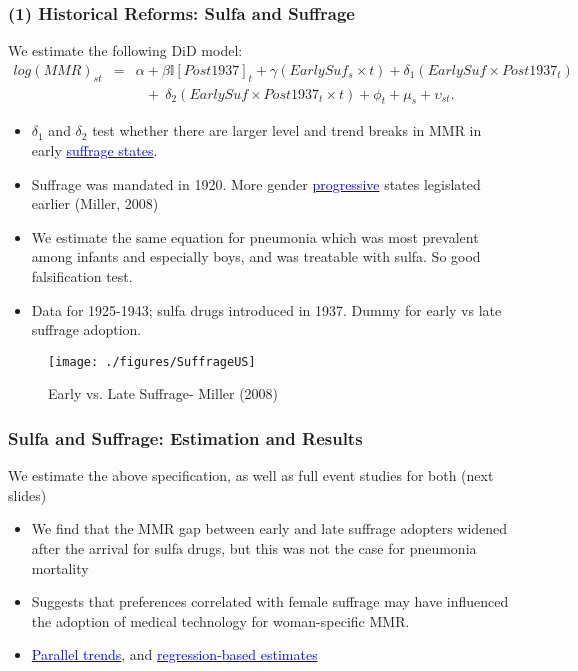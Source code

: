 \documentclass[10pt,letterpaper,subeqn]{beamer}
\begin{document}
\begin{frame}[label=USAHistory]
\frametitle{(1) Historical Reforms: Sulfa and Suffrage}

We estimate the following DiD model:
\scriptsize
\begin{eqnarray}
log(MMR)_{st} & = &\alpha + \beta \mathbb{I}[Post1937]_t + \gamma(EarlySuf_{s}\times t)
                + \delta_1 (EarlySuf\times Post1937_t) \nonumber \\
              & &\ \ \ + \ \delta_2 (EarlySuf\times Post1937_t\times t) + \phi_t + \mu_s
                + \upsilon_{st}. \nonumber
\end{eqnarray}
\normalsize
\begin{itemize}
\setlength{\itemsep}{15pt}
  \item $\delta_1$ and $\delta_2$ test whether there are larger level and trend 
        breaks in MMR in early  \hyperlink{SuffrageUS}{\textcolor{blue}{suffrage states}}.
  \item Suffrage was mandated in 1920.  More gender \hyperlink{WhySuffrage}{\textcolor{blue}{progressive}} states legislated
        earlier (Miller, 2008)
  \item We estimate the same equation for pneumonia which was most prevalent 
        among infants and especially boys, and was treatable with sulfa. So good 
        falsification test.
  \item Data for 1925-1943; sulfa drugs introduced in 1937. Dummy for early vs 
        late suffrage adoption.
\end{itemize}
\end{frame}

\begin{frame}[plain,label=SuffrageUS]
\begin{figure}[h!]
\centering
\texttt{[image: ./figures/SuffrageUS]}
\caption{Early vs. Late Suffrage- Miller (2008)}
\end{figure}
\end{frame}


\begin{frame}[label=USA]
\frametitle{Sulfa and Suffrage: Estimation and Results}
We estimate the above specification, as well as full event studies for both 
(next slides)
\vspace{5mm}
\begin{itemize}
\setlength{\itemsep}{15pt}
  \item We find that the MMR gap between early and late suffrage adopters widened 
        after the arrival for sulfa drugs, but this was not the case for 
        pneumonia mortality
  \item Suggests that preferences correlated with female suffrage may have 
        influenced the adoption of medical technology for woman-specific MMR.
  \item \hyperlink{ptrends}{\textcolor{blue}{Parallel trends}}, and 
        \hyperlink{DDreg}{\textcolor{blue}{regression-based estimates}}
\end{itemize}
\end{frame}
\end{document}
